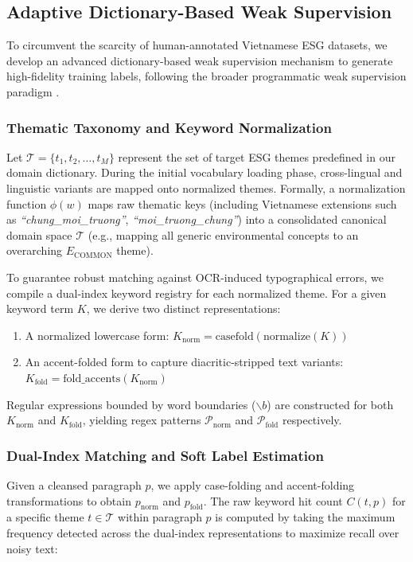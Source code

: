 \documentclass{article}
\theoremstyle{plain}
\theoremstyle{definition}
\theoremstyle{remark}
\begin{document}
\subsection{Adaptive Dictionary-Based Weak Supervision}
To circumvent the scarcity of human-annotated Vietnamese ESG datasets, we develop an advanced dictionary-based weak supervision mechanism to generate high-fidelity training labels, following the broader programmatic weak supervision paradigm \citep{ratner2017snorkel}.

\subsubsection{Thematic Taxonomy and Keyword Normalization}
Let $\mathcal{T} = \{t_1, t_2, \dots, t_M\}$ represent the set of target ESG themes predefined in our domain dictionary. During the initial vocabulary loading phase, cross-lingual and linguistic variants are mapped onto normalized themes. Formally, a normalization function $\phi(w)$ maps raw thematic keys (including Vietnamese extensions such as \textit{``chung\_moi\_truong''}, \textit{``moi\_truong\_chung''}) into a consolidated canonical domain space $\mathcal{T}$ (e.g., mapping all generic environmental concepts to an overarching $E_{\text{COMMON}}$ theme).

To guarantee robust matching against OCR-induced typographical errors, we compile a dual-index keyword registry for each normalized theme. For a given keyword term $K$, we derive two distinct representations:
\begin{enumerate}
    \item A normalized lowercase form: $K_{\text{norm}} = \text{casefold}(\text{normalize}(K))$
    \item An accent-folded form to capture diacritic-stripped text variants: $K_{\text{fold}} = \text{fold\_accents}(K_{\text{norm}})$
\end{enumerate}
Regular expressions bounded by word boundaries ($\backslash b$) are constructed for both $K_{\text{norm}}$ and $K_{\text{fold}}$, yielding regex patterns $\mathcal{P}_{\text{norm}}$ and $\mathcal{P}_{\text{fold}}$ respectively.

\subsubsection{Dual-Index Matching and Soft Label Estimation}
Given a cleansed paragraph $p$, we apply case-folding and accent-folding transformations to obtain $p_{\text{norm}}$ and $p_{\text{fold}}$. The raw keyword hit count $C(t, p)$ for a specific theme $t \in \mathcal{T}$ within paragraph $p$ is computed by taking the maximum frequency detected across the dual-index representations to maximize recall over noisy text:
\end{document}
